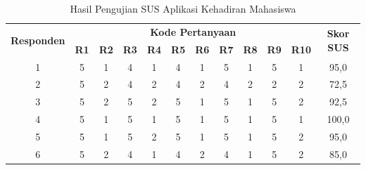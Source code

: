 \begin{enumerate}[a.]
\begin{table}[H]
	\fontsize{10}{12}\selectfont
	\center
	\caption{Hasil Pengujian SUS Aplikasi Kehadiran Mahasiswa}
	\label{sus-aplikasi-mahasiswa}
	\begin{tabular}{|c|c|c|c|c|c|c|c|c|c|c|c|}
		\hline
		\multirow{2}{*}{\textbf{Responden}}         & \multicolumn{10}{c|}{\textbf{Kode Pertanyaan}} & \multirow{2}{*}{\textbf{Skor SUS}}                                                                                                                                               \\ \cline{2-11}
		                                            & \textbf{R1}                                    & \textbf{R2}                        & \textbf{R3} & \textbf{R4} & \textbf{R5} & \textbf{R6} & \textbf{R7} & \textbf{R8} & \textbf{R9} & \multicolumn{1}{l|}{\textbf{R10}} &       \\ \hline
		1                                           & 5                                              & 1                                  & 4           & 1           & 4           & 1           & 5           & 1           & 5           & 1                                 & 95,0  \\ \hline
		2                                           & 5                                              & 2                                  & 4           & 2           & 4           & 2           & 4           & 2           & 2           & 2                                 & 72,5  \\ \hline
		3                                           & 5                                              & 2                                  & 5           & 2           & 5           & 1           & 5           & 1           & 5           & 2                                 & 92,5  \\ \hline
		4                                           & 5                                              & 1                                  & 5           & 1           & 5           & 1           & 5           & 1           & 5           & 1                                 & 100,0 \\ \hline
		5                                           & 5                                              & 1                                  & 5           & 2           & 5           & 1           & 5           & 1           & 5           & 2                                 & 95,0  \\ \hline
		6                                           & 5                                              & 2                                  & 4           & 1           & 4           & 2           & 4           & 1           & 5           & 2                                 & 85,0  \\ \hline

\end{tabular}
\end{table}
\end{enumerate}
